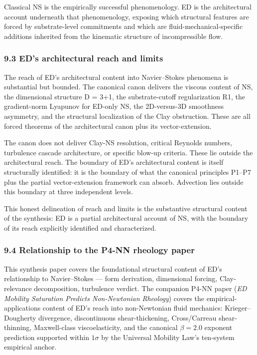 \documentclass[
  11pt,a4paper]{article}
\begin{document}
Classical NS is the empirically successful phenomenology. ED is the
architectural account underneath that phenomenology, exposing which
structural features are forced by substrate-level commitments and which
are fluid-mechanical-specific additions inherited from the kinematic
structure of incompressible flow.

\subsubsection{9.3 ED's architectural reach and
limits}\label{eds-architectural-reach-and-limits}

The reach of ED's architectural content into Navier--Stokes phenomena is
substantial but bounded. The canonical canon delivers the viscous
content of NS, the dimensional structure D = 3+1, the substrate-cutoff
regularization R1, the gradient-norm Lyapunov for ED-only NS, the
2D-versus-3D smoothness asymmetry, and the structural localization of
the Clay obstruction. These are all forced theorems of the architectural
canon plus its vector-extension.

The canon does not deliver Clay-NS resolution, critical Reynolds
numbers, turbulence cascade architecture, or specific blow-up criteria.
These lie outside the architectural reach. The boundary of ED's
architectural content is itself structurally identified: it is the
boundary of what the canonical principles P1--P7 plus the partial
vector-extension framework can absorb. Advection lies outside this
boundary at three independent levels.

This honest delineation of reach and limits is the substantive
structural content of the synthesis: ED is a partial architectural
account of NS, with the boundary of its reach explicitly identified and
characterized.

\subsubsection{9.4 Relationship to the P4-NN rheology
paper}\label{relationship-to-the-p4-nn-rheology-paper}

This synthesis paper covers the foundational structural content of ED's
relationship to Navier--Stokes --- form derivation, dimensional forcing,
Clay-relevance decomposition, turbulence verdict. The companion P4-NN
paper (\emph{ED Mobility Saturation Predicts Non-Newtonian Rheology})
covers the empirical-applications content of ED's reach into
non-Newtonian fluid mechanics: Krieger--Dougherty divergence,
discontinuous shear-thickening, Cross/Carreau shear-thinning,
Maxwell-class viscoelasticity, and the canonical \(\beta = 2.0\)
exponent prediction supported within \(1\sigma\) by the Universal
Mobility Law's ten-system empirical anchor.
\end{document}
